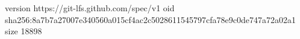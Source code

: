 version https://git-lfs.github.com/spec/v1
oid sha256:8a7b7a27007e340560a015cf4ac2c5028611545797cfa78e9c0de747a72a02a1
size 18898
